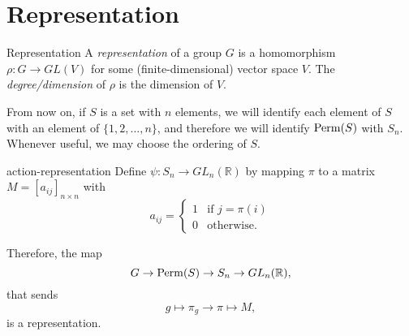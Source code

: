 
\section{Representation}

\begin{defn}{Representation}{}
  A \emph{representation} of a group \(G\) is a homomorphism \(\rho\colon G \to GL(V)\) for some (finite-dimensional) vector space \(V\). The \emph{degree/dimension} of \(\rho\) is the dimension of \(V\).
\end{defn}

From now on, if \(S\) is a set with \(n\) elements, we will identify each element of \(S\) with an element of \(\{1, 2, \dots, n\}\), and therefore we will identify \(\operatorname{Perm}(S)\) with \(S_n\).
Whenever useful, we may choose the ordering of \(S\).

\begin{prop}{}{action-representation}
  Define \(\psi\colon S_n \to GL_n(\mathbb{R})\) by mapping \(\pi\) to a matrix \(M = [a_{ij}]_{n \times n}\) with \[
    a_{ij} =
	\begin{cases}
	  1 & \text{if }j = \pi(i)\\
	  0 & \text{otherwise.}
	\end{cases}
  \] 

  Therefore, the map \[
    G \to \operatorname{Perm}(S) \to S_n \to GL_n(\mathbb{R}),
  \] that sends \[
    g \mapsto \pi_g \to \pi \mapsto M,
  \] 
  is a representation.
\end{prop}
